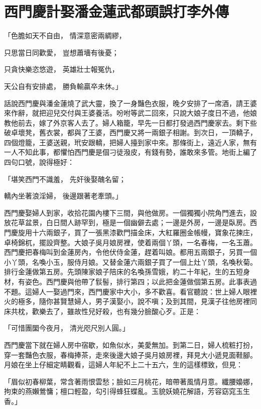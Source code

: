 %

\chapter{西門慶計娶潘金蓮\KG 武都頭誤打李外傳}


「色膽如天不自由，  情深意密兩綢繆，

只思當日同歡愛，  豈想蕭墻有後憂；

只貪快樂恣悠遊，  英雄壯士報冤仇，

天公自有安排處，  勝負輸贏卒未休。」

話說西門慶與潘金蓮燒了武大靈，換了一身豔色衣服，晚夕安排了一席酒，請王婆來作辭，就把迎兒交付與王婆養活。吩咐等武二回來，只說大娘子度日不過，他娘教他前去，嫁了外京客人去了。婦人箱籠，早先一日都打發過西門慶家去。剩下些破卓壞凳，舊衣裳，都與了王婆，西門慶又將一兩銀子相謝。到次日，一頂轎子，四個燈籠，王婆送親，玳安跟轎，把婦人擡到家中來。那條街上，遠近人家，無有一人不知此事，都懼怕西門慶是個刁徒潑皮，有錢有勢，誰敢來多管。地街上編了四句口號，說得極好：

「堪笑西門不識羞，  先奸後娶醜名留；

轎內坐著浪淫婦，  後邊跟著老牽頭。」

西門慶娶婦人到家，收拾花園內樓下三間，與他做房。一個獨獨小院角門進去，設放花草盆景，白日間人跡罕到，極是一個幽僻去處；一邊是外房，一邊是臥房。西門慶旋用十六兩銀子，買了一張黑漆歡門描金床，大紅羅圈金帳幔，寶象花揀庄，卓椅錦杌，擺設齊整。大娘子吳月娘房裡，使着兩個丫頭，一名春梅，一名玉蕭。西門慶把春梅叫到金蓮房內，令他伏侍金蓮，趕着叫娘。都用五兩銀子，另買一個小丫頭，名喚小玉，服侍月娘。又替金蓮六兩銀子買了一個上灶丫頭，名喚秋菊。排行金蓮做第五房。先頭陳家娘子陪床的名喚孫雪娥，約二十年紀，生的五短身材，有姿色。西門慶與他帶了䯼髻，排行第四；以此把金蓮做個第五房。此事表過不題。這婦人一娶過門來，西門慶家中大小，多不歡喜。看官聽說：世上婦人眼裡火的極多，隨你甚賢慧婦人，男子漢娶小，說不嗔；及到其間，見漢子往他房裡同床共枕，歡樂去了，雖故性兒好殺，也有幾分臉酸心歹。正是：

「可惜團圞今夜月，  清光咫尺別人圓。」

西門慶當下就在婦人房中宿歇，如魚似水，美愛無加。到第二日，婦人梳粧打扮，穿一套豔色衣服，春梅捧茶，走來後邊大娘子吳月娘房裡，拜見大小遞見面鞋腳。月娘在坐上仔細定睛觀看，這婦人年紀不上二十五六，生的這樣標致，但見：

「眉似初春柳葉，常含著雨恨雲愁；臉如三月桃花，暗帶著風情月意。纖腰嬝娜，拘束的燕嬾鶯慵；檀口輕盈，勾引得蜂狂蝶亂。玉貌妖嬈花解語，芳容窈窕玉生香。」

